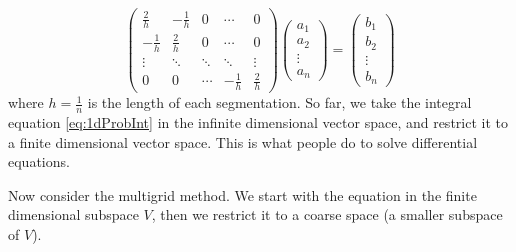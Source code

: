 \begin{equation}
\left(
	\begin{array}{ccccc}
	\frac{2}{h} & -\frac{1}{h} & 0 &\cdots &0\\
	-\frac{1}{h} & \frac{2}{h} & 0 &\cdots &0 \\ 
	\vdots & \ddots  & \ddots & \ddots &\vdots \\
	0 & 0 & \cdots &-\frac{1}{h} & \frac{2}{h} 
	\end{array} \right)
\left(
	\begin{array}{c}
	a_1\\ a_2 \\
	\vdots \\ a_n
	\end{array} \right)
=
\left(
	\begin{array}{c}
	b_1\\ b_2 \\
	\vdots \\ b_n
	\end{array} \right)
\end{equation}
where $h = \frac{1}{n}$ is the length of each segmentation. 
So far, we take the integral equation \eqref{eq:1dProbInt} in the infinite dimensional vector space, and restrict it to a finite dimensional vector space. This is what people do to solve differential equations. 

Now consider the multigrid method. We start with the equation in the finite dimensional subspace $V$, then we restrict it to a coarse space (a smaller subspace of $V$). 

